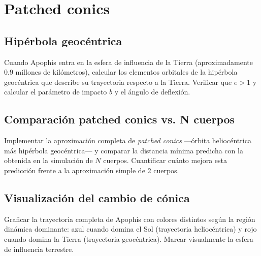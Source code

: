 \section{Patched conics}

\subsection{Hipérbola geocéntrica}

Cuando Apophis entra en la esfera de influencia de la Tierra (aproximadamente $0.9$ millones de kilómetros), calcular los elementos orbitales de la hipérbola geocéntrica que describe su trayectoria respecto a la Tierra. Verificar que $e > 1$ y calcular el parámetro de impacto $b$ y el ángulo de deflexión.

\subsection{Comparación patched conics vs. N cuerpos}

Implementar la aproximación completa de \textit{patched conics} ---órbita heliocéntrica más hipérbola geocéntrica--- y comparar la distancia mínima predicha con la obtenida en la simulación de $N$ cuerpos. Cuantificar cuánto mejora esta predicción frente a la aproximación simple de 2 cuerpos.

\subsection{Visualización del cambio de cónica}

Graficar la trayectoria completa de Apophis con colores distintos según la región dinámica dominante: azul cuando domina el Sol (trayectoria heliocéntrica) y rojo cuando domina la Tierra (trayectoria geocéntrica). Marcar visualmente la esfera de influencia terrestre.